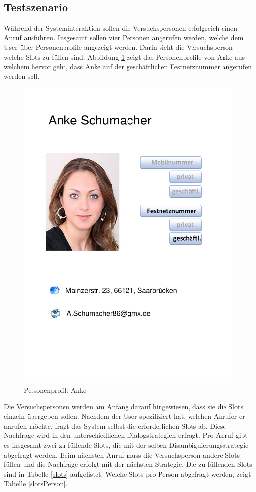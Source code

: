 \documentclass[12pt,a4paper]{scrartcl}
\begin{document}
\subsection{Testszenario}
Während der Systeminteraktion sollen die Versuchspersonen erfolgreich einen Anruf ausführen. Insgesamt sollen vier Personen angerufen werden, welche dem User über Personenprofile angezeigt werden.  Darin sieht die Versuchsperson welche Slots zu füllen sind. Abbildung \ref{anke} zeigt das Personenprofile von Anke aus welchem hervor geht, dass Anke auf der geschäftlichen Festnetznummer angerufen werden soll. 
\begin{figure}[htbp]
\begin{center}
\includegraphics[width=12cm]{Anke.pdf}
\caption{Personenprofil: Anke}
\label{anke}
\end{center}
\end{figure}
Die Versuchspersonen werden am Anfang darauf hingewiesen, dass sie die Slots einzeln übergeben sollen. Nachdem der User spezifiziert hat, welchen Anrufer er anrufen möchte, fragt das System selbst die erforderlichen Slots ab. Diese Nachfrage wird in den unterschiedlichen Dialogstrategien erfragt. Pro Anruf gibt es insgesamt zwei zu füllende Slots, die mit der selben Disambiguierungsstrategie abgefragt werden. Beim nächsten Anruf muss die Versuchsperson andere Slots füllen und die Nachfrage erfolgt mit der nächsten Strategie. 
Die zu füllenden Slots sind in Tabelle \ref{slots} aufgelistet. Welche Slots pro Person abgefragt werden, zeigt Tabelle \ref{slotsPerson}.
\end{document}
